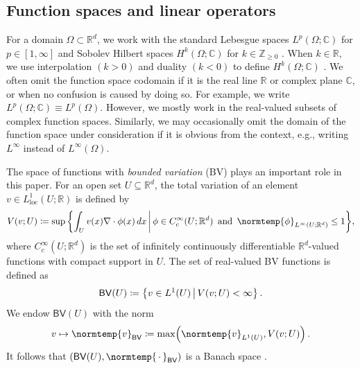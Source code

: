 \documentclass[pdflatex,sn-mathphys-num]{sn-jnl-preprint}
\let\originalleft\left %
\let\originalright\right
\renewcommand{\left}{\mathopen{}\mathclose\bgroup\originalleft}
\renewcommand{\right}{\aftergroup\egroup\originalright}
\newcommand{\Z}{\mathbb{Z}}
\newcommand{\R}{\mathbb{R}}
\newcommand{\C}{\mathbb{C}}
\newcommand{\BV}{\mathsf{BV}}
\newcommand{\norm}{\normtemp}
\newcommand{\set}[2]{{\left\{ #1 \,\middle|\, #2 \right\}}}
\newcommand{\defeq}{\coloneqq} %
\newcommand{\diff}{d}
\newcommand{\dd}[1]{\,\diff{#1}}
\newcommand{\slot}{{\,\cdot\,}}
\theoremstyle{thmstyleone}%
\theoremstyle{thmstyletwo}%
\theoremstyle{thmstylethree}%
\numberwithin{equation}{section}
\numberwithin{theorem}{section}
\begin{document}
\subsection{Function spaces and linear operators}\label{sec:prelim_func}
For a domain $\Omega\subset \R^d$, we work with the standard Lebesgue spaces $L^p(\Omega;\C)$ for $p\in[1,\infty]$ and Sobolev Hilbert spaces $H^k(\Omega;\C)$ for $k\in\Z_{\geq 0}$ \cite{adams2003sobolev,lions2012non}. When $k\in\R$, we use interpolation $(k>0)$ and duality $(k<0)$ to define $H^k(\Omega;\C)$ \cite[Appendix~A]{abraham2019statistical}. We often omit the function space codomain if it is the real line $\R$ or complex plane $\C$, or when no confusion is caused by doing so. For example, we write $L^p(\Omega;\C)\equiv L^p(\Omega)$. However, we mostly work in the real-valued subsets of complex function spaces. Similarly, we may occasionally omit the domain of the function space under consideration if it is obvious from the context, e.g., writing $L^\infty$ instead of $L^\infty(\Omega)$.

The space of functions with \emph{bounded variation} (BV) \cite[Chp.~14.1]{leoni2017first} plays an important role in this paper. For an open set $U\subseteq\R^d$, the total variation of an element $v\in L^1_{\mathrm{loc}}(U;\R)$ is defined by
\begin{align}
	V(v;U)\defeq\sup\set{\int_{U}v(x)\nabla\cdot\phi(x)\dd{x}}{\phi\in C_c^{\infty}(U;\R^d) \,\ \text{and} \,\ \norm{\phi}_{L^\infty(U;\R^d)}\leq 1},
\end{align}
where $C_c^\infty(U;\R^d)$ is the set of infinitely continuously differentiable $\R^d$-valued functions with compact support in $U$. The set of real-valued BV functions is defined as
\begin{align}
	\mathsf{BV}(U)\defeq \set{v\in L^1(U)}{V(v;U)<\infty}\,.
\end{align}
We endow $\mathsf{BV}(U)$ with the norm
\begin{align}
	v\mapsto \norm{v}_{\BV}\defeq \max\Bigl(\norm{v}_{L^1(U)}, V(v;U)\Bigr)\,.
\end{align}
It follows that $(\BV(U),\norm{\slot}_\BV)$ is a Banach space \cite{leoni2017first}.
\end{document}

